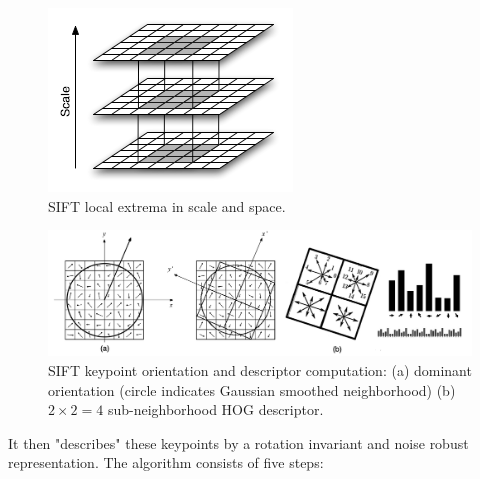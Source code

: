 \begin{figure}
    \centering
    \includegraphics[width=.5\linewidth,keepaspectratio]{figures/registration/sift/sift_extrema.png}
    \caption{SIFT local extrema in scale and space.}
    \label{fig:sift_extrema}
\end{figure}
\begin{figure}
    \centering
    \includegraphics[width=\linewidth,keepaspectratio]{figures/registration/sift/sift_descriptor.png}
    \caption{SIFT keypoint orientation and descriptor computation: (a) dominant orientation (circle indicates Gaussian smoothed neighborhood) (b) $2 \times 2 = 4$ sub-neighborhood HOG descriptor\cite{lowe2004distinctive}.}
    \label{fig:sift_descriptor}
\end{figure}
%
It then "describes" these keypoints by a rotation invariant and noise robust representation.
%
The algorithm consists of five steps:
